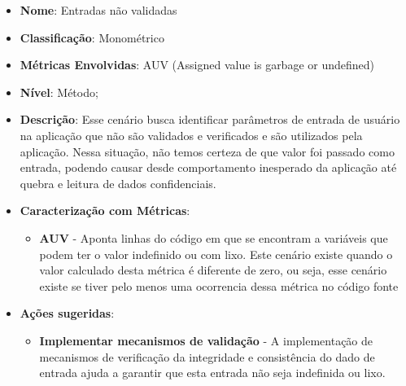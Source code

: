 \begin{itemize}
\item \textbf{Nome}: Entradas não validadas
\item \textbf{Classificação}: Monométrico
\item \textbf{Métricas Envolvidas}: AUV (Assigned value is garbage or undefined)
\item \textbf{Nível}: Método;
\item \textbf{Descrição}: Esse cenário busca identificar parâmetros de entrada de usuário na aplicação que não são validados e verificados e são utilizados pela aplicação. Nessa situação, não temos certeza de que valor foi passado como entrada, podendo causar desde comportamento inesperado da aplicação até quebra e leitura de dados confidenciais.
\item \textbf{Caracterização com Métricas}: 
	\begin{itemize}
	\item \textbf{AUV} - Aponta linhas do código em que se encontram a variáveis que podem ter o valor indefinido ou com lixo. Este cenário existe quando o valor calculado desta métrica é diferente de zero, ou seja, esse cenário existe se tiver pelo menos uma ocorrencia dessa métrica no código fonte
	\end{itemize}
\item \textbf{Ações sugeridas}: 
	\begin{itemize}
	\item \textbf{Implementar mecanismos de validação} - A implementação de mecanismos de verificação da integridade e consistência do dado de entrada ajuda a garantir que esta entrada não seja indefinida ou lixo.
	\end{itemize}
\end{itemize}


